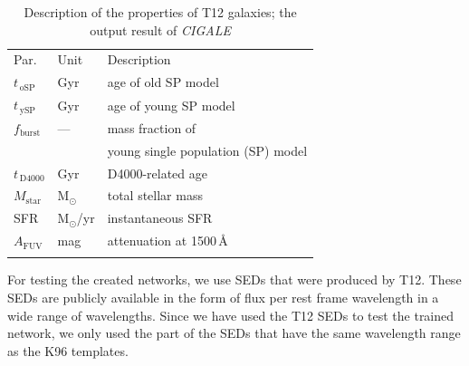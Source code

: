        
    \begin{table}
\caption[]{Description of the properties of T12 galaxies; the output result of {\em CIGALE}}     
\label{tab: props}
\centering
\begin{tabular}{l l l}
\hline\hline
\noalign{\smallskip}
Par. & Unit & Description\\
\noalign{\smallskip}
\hline
\noalign{\smallskip}
$t_{\,\mathrm{oSP}}$ & Gyr & age of old SP model \\
$t_{\,\mathrm{ySP}}$ & Gyr & age of young SP model \\
$f_\mathrm{burst}$ & --- & mass fraction of \\
& & young single population (SP) model \\
\noalign{\smallskip}
$t_{\,\mathrm{D4000}}$ & Gyr & D4000-related age \\
\noalign{\smallskip}
$M_\mathrm{star}$ & M$_\odot$ & total stellar mass  \\
SFR & M$_\odot$/yr & instantaneous SFR  \\
$A_\mathrm{FUV}$ & mag & attenuation at 1500\,\AA{} \\
\noalign{\smallskip}
\hline
\end{tabular}
\end{table}

    For testing the created networks, we use SEDs that were produced by T12. 
    These SEDs are publicly available in the form of flux per rest frame wavelength in a wide range of wavelengths. %
    Since we have used the T12 SEDs to test the trained network, we only used the part of the SEDs that have the same wavelength range as the K96 templates.  




